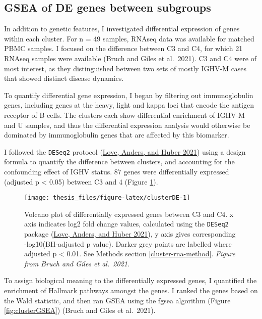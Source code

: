 \documentclass[11pt, a4paper, twosided]{book}
\begin{document}
\hypertarget{cluster-rna}{%
\subsection{GSEA of DE genes between subgroups}\label{cluster-rna}}

In addition to genetic features, I investigated differential expression of genes within each cluster. For n = 49 samples, RNAseq data was available for matched PBMC samples. I focused on the difference between C3 and C4, for which 21 RNAseq samples were available (Bruch and Giles et al.~2021). C3 and C4 were of most interest, as they distinguished between two sets of mostly IGHV-M cases that showed distinct disease dynamics.

To quantify differential gene expression, I began by filtering out immunoglobulin genes, including genes at the heavy, light and kappa loci that encode the antigen receptor of B cells. The clusters each show differential enrichment of IGHV-M and U samples, and thus the differential expression analysis would otherwise be dominated by immunoglobulin genes that are affected by this biomarker.

I followed the \texttt{DESeq2} protocol (\protect\hyperlink{ref-R-DESeq2}{Love, Anders, and Huber 2021}) using a design formula to quantify the difference between clusters, and accounting for the confounding effect of IGHV status. 87 genes were differentially expressed (adjusted p \textless{} 0.05) between C3 and 4 (Figure \ref{fig:clusterDE}).


\begin{figure}

{\centering \texttt{[image: thesis\_files/figure-latex/clusterDE-1]} 

}

\caption{Volcano plot of differentially expressed genes between C3 and C4. x axis indicates log2 fold change values, calculated using the \texttt{DESeq2} package (\protect\hyperlink{ref-R-DESeq2}{Love, Anders, and Huber 2021}), y axis gives corresponding -log10(BH-adjusted p value). Darker grey points are labelled where adjusted p \textless{} 0.01. See Methods section \ref{cluster-rna-method}. \emph{Figure from Bruch and Giles et al.~2021.}}\label{fig:clusterDE}
\end{figure}
To assign biological meaning to the differentially expressed genes, I quantified the enrichment of Hallmark pathways amongst the genes. I ranked the genes based on the Wald statistic, and then ran GSEA using the fgsea algorithm (Figure \ref{fig:clusterGSEA}) (Bruch and Giles et al.~2021).
\end{document}
